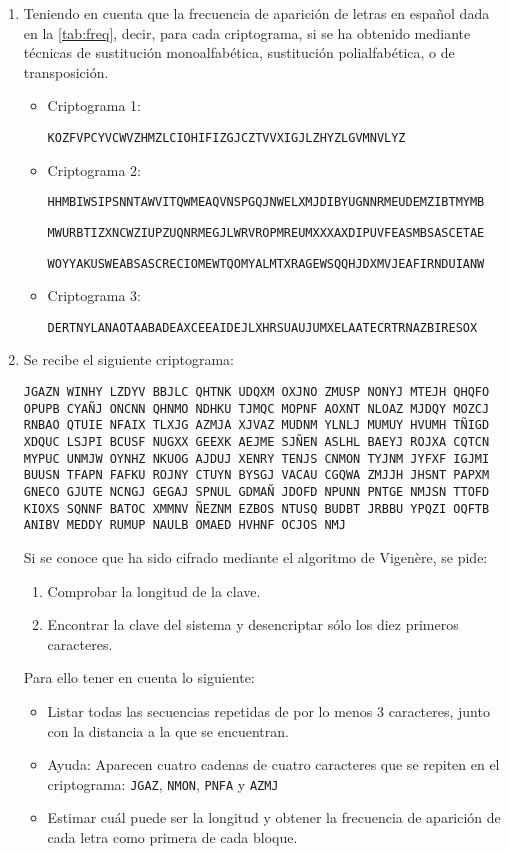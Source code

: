 \documentclass[]{book}
\theoremstyle{definition}
\begin{document}
\begin{enumerate}
\item Teniendo en cuenta que la frecuencia de aparición de letras en español
  dada en la \autoref{tab:freq}, decir, para cada criptograma, si se ha obtenido mediante técnicas de sustitución monoalfabética, sustitución polialfabética, o de transposición. 
  \begin{itemize}
    \item Criptograma 1:

        \verb+KOZFVPCYVCWVZHMZLCIOHIFIZGJCZTVVXIGJLZHYZLGVMNVLYZ+
    \item Criptograma 2:
      
      \verb+HHMBIWSIPSNNTAWVITQWMEAQVNSPGQJNWELXMJDIBYUGNNRMEUDEMZIBTMYMB+

      \verb+MWURBTIZXNCWZIUPZUQNRMEGJLWRVROPMREUMXXXAXDIPUVFEASMBSASCETAE+

      \verb+WOYYAKUSWEABSASCRECIOMEWTQOMYALMTXRAGEWSQQHJDXMVJEAFIRNDUIANW+
    \item Criptograma 3:

        \verb+DERTNYLANAOTAABADEAXCEEAIDEJLXHRSUAUJUMXELAATECRTRNAZBIRESOX+
      \end{itemize}
\item Se recibe el siguiente criptograma:
\begin{verbatim}
JGAZN WINHY LZDYV BBJLC QHTNK UDQXM OXJNO ZMUSP NONYJ MTEJH QHQFO 
OPUPB CYAÑJ ONCNN QHNMO NDHKU TJMQC MOPNF AOXNT NLOAZ MJDQY MOZCJ 
RNBAO QTUIE NFAIX TLXJG AZMJA XJVAZ MUDNM YLNLJ MUMUY HVUMH TÑIGD 
XDQUC LSJPI BCUSF NUGXX GEEXK AEJME SJÑEN ASLHL BAEYJ ROJXA CQTCN 
MYPUC UNMJW OYNHZ NKUOG AJDUJ XENRY TENJS CNMON TYJNM JYFXF IGJMI 
BUUSN TFAPN FAFKU ROJNY CTUYN BYSGJ VACAU CGQWA ZMJJH JHSNT PAPXM 
GNECO GJUTE NCNGJ GEGAJ SPNUL GDMAÑ JDOFD NPUNN PNTGE NMJSN TTOFD 
KIOXS SQNNF BATOC XMMNV ÑEZNM EZBOS NTUSQ BUDBT JRBBU YPQZI OQFTB
ANIBV MEDDY RUMUP NAULB OMAED HVHNF OCJOS NMJ
\end{verbatim}

Si se conoce que ha sido cifrado mediante el algoritmo de Vigenère, se pide: 
  \begin{enumerate}
    \item Comprobar la longitud de la clave. 
    \item Encontrar la clave del sistema y desencriptar sólo los diez primeros caracteres. 
  \end{enumerate}
Para ello tener en cuenta lo siguiente: 

\begin{itemize}
  \item Listar todas las secuencias repetidas de por lo menos 3 caracteres, junto con la distancia a la que se encuentran. 
  \item Ayuda: Aparecen cuatro cadenas de cuatro caracteres que se repiten en el criptograma: \verb+JGAZ+, \verb+NMON+, \verb+PNFA+ y \verb+AZMJ+
  \item Estimar cuál puede ser la longitud y obtener la frecuencia de aparición de cada letra como primera de cada bloque. 
  \end{itemize}


\end{enumerate}
\end{document}
